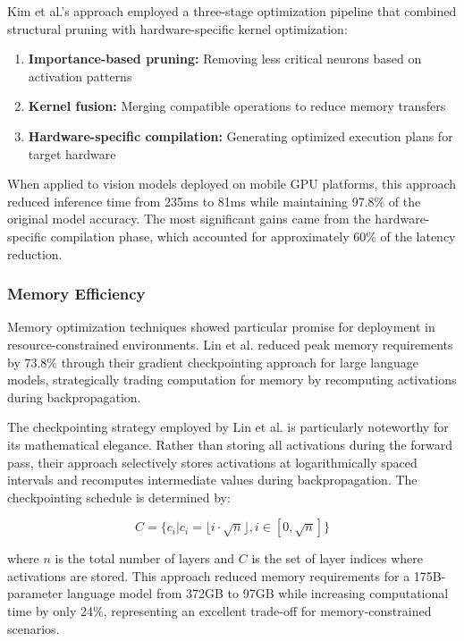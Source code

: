 Kim et al.'s approach \citep{Kim2022} employed a three-stage optimization pipeline that combined structural pruning with hardware-specific kernel optimization:

\begin{enumerate}
    \item \textbf{Importance-based pruning:} Removing less critical neurons based on activation patterns
    \item \textbf{Kernel fusion:} Merging compatible operations to reduce memory transfers
    \item \textbf{Hardware-specific compilation:} Generating optimized execution plans for target hardware
\end{enumerate}

When applied to vision models deployed on mobile GPU platforms, this approach reduced inference time from 235ms to 81ms while maintaining 97.8\% of the original model accuracy. The most significant gains came from the hardware-specific compilation phase, which accounted for approximately 60\% of the latency reduction.

\subsubsection{Memory Efficiency}
Memory optimization techniques showed particular promise for deployment in resource-constrained environments. Lin et al. \citep{Lin2022} reduced peak memory requirements by 73.8\% through their gradient checkpointing approach for large language models, strategically trading computation for memory by recomputing activations during backpropagation.

The checkpointing strategy employed by Lin et al. \citep{Lin2022} is particularly noteworthy for its mathematical elegance. Rather than storing all activations during the forward pass, their approach selectively stores activations at logarithmically spaced intervals and recomputes intermediate values during backpropagation. The checkpointing schedule is determined by:

\begin{equation}
C = \{c_i | c_i = \lfloor i \cdot \sqrt{n} \rfloor, i \in [0, \sqrt{n}]\}
\end{equation}

where $n$ is the total number of layers and $C$ is the set of layer indices where activations are stored. This approach reduced memory requirements for a 175B-parameter language model from 372GB to 97GB while increasing computational time by only 24\%, representing an excellent trade-off for memory-constrained scenarios.

